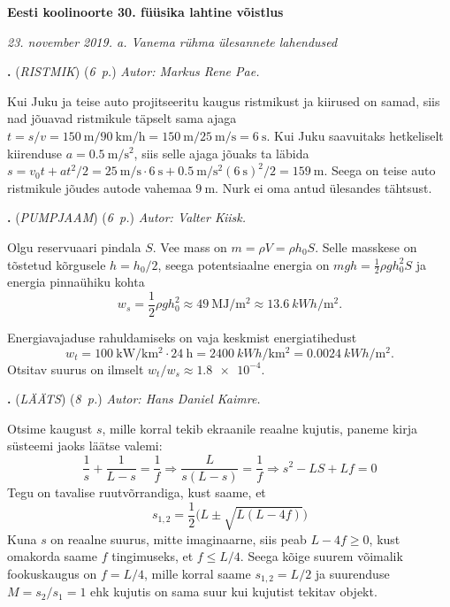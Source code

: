 \documentclass[12pt,a5paper]{article}
\newcommand{\numb}[1]{\vspace{5pt}\textbf{\large #1}}
\newcommand{\nimi}[1]{(\textsl{\small #1})}
\newcommand{\punktid}[1]{(\emph{#1~p.})}
\newcommand{\autor}[1]{\emph{ Autor: #1.}}
\newcounter{ylesanne}
\newcommand{\yl}[1]{\addtocounter{ylesanne}{1}\numb{\theylesanne.} \nimi{#1} \newblock{}}
\begin{document}
\begin{center}
\textbf{\large Eesti koolinoorte 30. füüsika lahtine võistlus} \vspace{3pt}

\emph{23. november 2019. a. Vanema rühma ülesannete lahendused}
\end{center}



\yl{RISTMIK} \punktid{6} \autor{Markus Rene Pae}

Kui Juku ja teise auto projitseeritu kaugus ristmikust ja kiirused on samad, siis nad jõuavad ristmikule täpselt sama ajaga $t = s/v = \SI{150}{\meter} / \SI{90}{\kilo\meter\per\hour} = \SI{150}{\meter} / \SI{25}{\meter\per\second} = \SI{6}{\second}$. Kui Juku saavuitaks hetkeliselt kiirenduse $a = \SI{0.5}{\meter\per\second\squared}$, siis selle ajaga jõuaks ta läbida $s = v_0 t + a t^2/2 = \SI{25}{\meter\per\second} \cdot \SI{6}{\second} + \SI{0.5}{\meter\per\second\squared} (\SI{6}{\second})^2 / 2 = \SI{159}{\meter}$. Seega on teise auto ristmikule jõudes autode vahemaa $\SI{9}{\meter}$. Nurk ei oma antud ülesandes tähtsust.



\yl{PUMPJAAM} \punktid{6} \autor{Valter Kiisk}

Olgu reservuaari pindala $S$. Vee mass on $m=\rho V=\rho h_0S$. Selle masskese on tõstetud kõrgusele $h=h_0/2$, seega potentsiaalne energia on $mgh=\frac{1}{2}\rho gh_0^2S$ ja energia pinnaühiku kohta
\[
w_s=\frac{1}{2}\rho gh_0^2\approx \SI{49}{\mega\joule\per\meter\squared}\approx\SI{13.6}{kWh\per\meter\squared}.
\]

Energiavajaduse rahuldamiseks on vaja keskmist energiatihedust
\[
w_t=\SI{100}{\kilo\watt\per\kilo\meter\squared}\cdot \SI{24}{\hour}=\SI{2400}{kWh\per\kilo\meter\squared}=\SI{0.0024}{kWh\per\meter\squared}.
\]
Otsitav suurus on ilmselt $w_t/w_s\approx \num{1.8e-4}$.



\yl{LÄÄTS} \punktid{8} \autor{Hans Daniel Kaimre}

Otsime kaugust $s$, mille korral tekib ekraanile reaalne kujutis, paneme kirja süsteemi jaoks läätse valemi:
$$\frac{1}{s}+\frac{1}{L-s}=\frac{1}{f}\Rightarrow \frac{L}{s(L-s)}=\frac{1}{f} \Rightarrow s^2-LS+Lf=0$$
Tegu on tavalise ruutvõrrandiga, kust saame, et $$s_{1,2}=\frac{1}{2}\big(L\pm\sqrt{L(L-4f)}\big)$$
Kuna $s$ on reaalne suurus, mitte imaginaarne, siis peab $L-4f \geq 0$, kust omakorda saame $f$ tingimuseks, et $f \leq L/4$. Seega kõige suurem võimalik fookuskaugus on $f = L/4$, mille korral saame $s_{1,2} = L/2$ ja suurenduse $M=s_2/s_1 = 1$ ehk kujutis on sama suur kui kujutist tekitav objekt.
\end{document}
